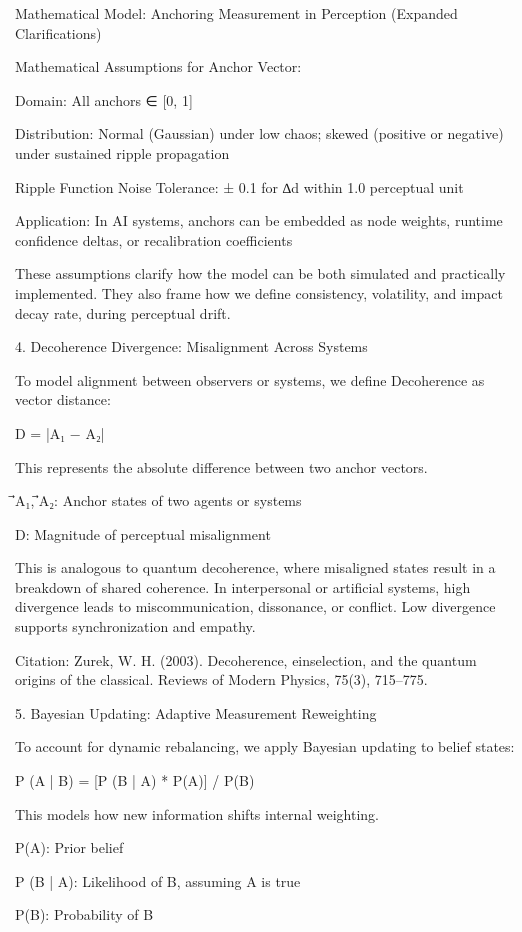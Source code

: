 \documentclass[12pt]{article}
\begin{document}
Mathematical Model: Anchoring Measurement in Perception (Expanded Clarifications)

Mathematical Assumptions for Anchor Vector:

Domain: All anchors ∈ [0, 1]

Distribution: Normal (Gaussian) under low chaos; skewed (positive or negative) under sustained ripple propagation

Ripple Function Noise Tolerance: ± 0.1 for ∆d within 1.0 perceptual unit

Application: In AI systems, anchors can be embedded as node weights, runtime confidence deltas, or recalibration coefficients

These assumptions clarify how the model can be both simulated and practically implemented. They also frame how we define consistency, volatility, and impact decay rate, during perceptual drift.

4. Decoherence Divergence: Misalignment Across Systems

To model alignment between observers or systems, we define Decoherence as vector distance:

D = |⃗A₁ − ⃗A₂|

This represents the absolute difference between two anchor vectors.

⃗A₁, ⃗A₂: Anchor states of two agents or systems

D: Magnitude of perceptual misalignment

This is analogous to quantum decoherence, where misaligned states result in a breakdown of shared coherence. In interpersonal or artificial systems, high divergence leads to miscommunication, dissonance, or conflict. Low divergence supports synchronization and empathy.

Citation: Zurek, W. H. (2003). Decoherence, einselection, and the quantum origins of the classical. Reviews of Modern Physics, 75(3), 715–775.

5. Bayesian Updating: Adaptive Measurement Reweighting

To account for dynamic rebalancing, we apply Bayesian updating to belief states:

P (A | B) = [P (B | A) * P(A)] / P(B)

This models how new information shifts internal weighting.

P(A): Prior belief

P (B | A): Likelihood of B, assuming A is true

P(B): Probability of B
\end{document}
